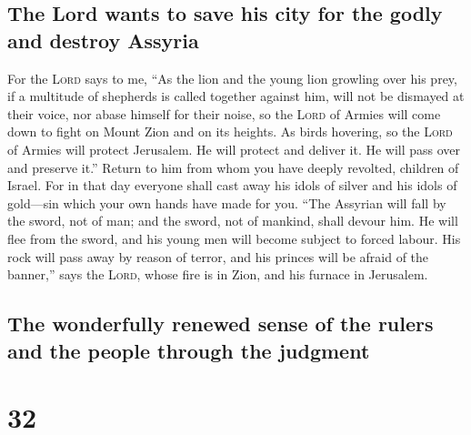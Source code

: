 \hypertarget{the-lord-wants-to-save-his-city-for-the-godly-and-destroy-assyria}{%
\subsection{The Lord wants to save his city for the godly and destroy
Assyria}\label{the-lord-wants-to-save-his-city-for-the-godly-and-destroy-assyria}}

 For the \textsc{Lord} says to me, ``As the lion and the
young lion growling over his prey, if a multitude of shepherds is called
together against him, will not be dismayed at their voice, nor abase
himself for their noise, so the \textsc{Lord} of Armies will come down
to fight on Mount Zion and on its heights.  As birds
hovering, so the \textsc{Lord} of Armies will protect Jerusalem. He will
protect and deliver it. He will pass over and preserve it.''
 Return to him from whom you have deeply revolted,
children of Israel.  For in that day everyone shall cast
away his idols of silver and his idols of gold---sin which your own
hands have made for you.  ``The Assyrian will fall by the
sword, not of man; and the sword, not of mankind, shall devour him. He
will flee from the sword, and his young men will become subject to
forced labour.  His rock will pass away by reason of
terror, and his princes will be afraid of the banner,'' says the
\textsc{Lord}, whose fire is in Zion, and his furnace in Jerusalem.

\hypertarget{the-wonderfully-renewed-sense-of-the-rulers-and-the-people-through-the-judgment}{%
\subsection{The wonderfully renewed sense of the rulers and the people
through the
judgment}\label{the-wonderfully-renewed-sense-of-the-rulers-and-the-people-through-the-judgment}}

\hypertarget{section-31}{%
\section{32}\label{section-31}}

